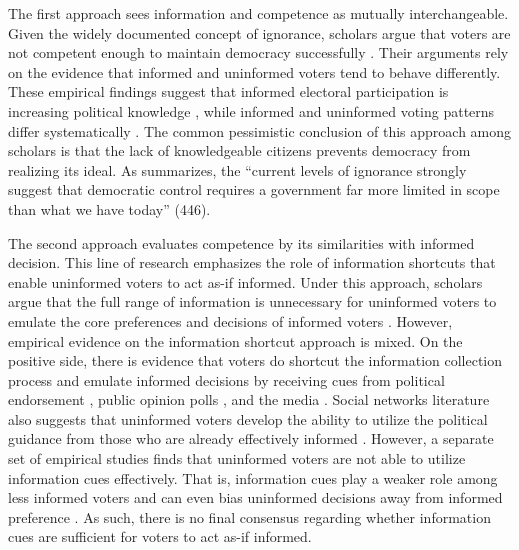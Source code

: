 \documentclass[doc,natbib,12pt]{apa6}
\begin{document}
	\par The first approach sees information and competence as mutually interchangeable. Given the widely documented concept of ignorance, scholars argue that voters are not competent enough to maintain democracy successfully \citep{Converse1964thna, Dellicarpini1996wham}. Their arguments rely on the evidence that informed and uninformed voters tend to behave differently. These empirical findings suggest that informed electoral participation is increasing political knowledge \citep{Gemenis2014voad, Lassen2005thef}, while informed and uninformed voting patterns differ systematically \citep{Bartels1996unvo, Fowler2014thpo}. The common pessimistic conclusion of this approach among scholars is that the lack of knowledgeable citizens prevents democracy from realizing its ideal. As \cite{Somin1998voig} summarizes, the ``current levels of ignorance strongly suggest that democratic control requires a government far more limited in scope than what we have today'' (446). 
	
	\par The second approach evaluates competence by its similarities with informed decision. This line of research emphasizes the role of information shortcuts \citep{Tversky1974juun} that enable uninformed voters to act as-if informed. Under this approach, scholars argue that the full range of information is unnecessary for uninformed voters to emulate the core preferences and decisions of informed voters \citep{Goren2012onvo, Lupia1998thde, Lupia2016unwh}. However, empirical evidence on the information shortcut approach is mixed. On the positive side, there is evidence that voters do shortcut the information collection process and emulate informed decisions by receiving cues from political endorsement \citep{Lupia1994shve}, public opinion polls \citep{McKelvey1986inel, Sinclair2012frun}, and the media \citep{Popkin1994thre}. Social networks literature also suggests that uninformed voters develop the ability to utilize the political guidance from those who are already effectively informed \citep{Ahn2013exan, Huckfeldt2001thso, Huckfeldt2014nobi}. However, a separate set of empirical studies finds that uninformed voters are not able to utilize information cues effectively. That is, information cues play a weaker role among less informed voters \citep{Hobolt2007tacu, Lau2001adan} and can even bias 
	uninformed decisions away from informed preference \citep{Boudreau2015loin}. As such, there is no final consensus regarding whether information cues are sufficient for voters to act as-if informed. 
	
\end{document}
